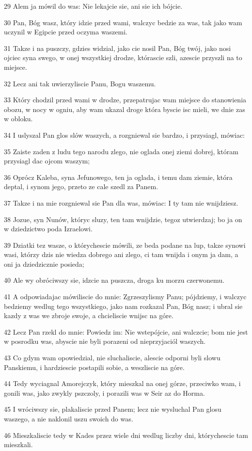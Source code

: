\par 29 Alem ja mówil do was: Nie lekajcie sie, ani sie ich bójcie.
\par 30 Pan, Bóg wasz, który idzie przed wami, walczyc bedzie za was, tak jako wam uczynil w Egipcie przed oczyma waszemi.
\par 31 Takze i na puszczy, gdzies widzial, jako cie nosil Pan, Bóg twój, jako nosi ojciec syna swego, w onej wszystkiej drodze, którascie szli, azescie przyszli na to miejsce.
\par 32 Lecz ani tak uwierzyliscie Panu, Bogu waszemu.
\par 33 Który chodzil przed wami w drodze, przepatrujac wam miejsce do stanowienia obozu, w nocy w ogniu, aby wam ukazal droge która byscie isc mieli, we dnie zas w obloku.
\par 34 I uslyszal Pan glos slów waszych, a rozgniewal sie bardzo, i przysiagl, mówiac:
\par 35 Zaiste zaden z ludu tego narodu zlego, nie oglada onej ziemi dobrej, któram przysiagl dac ojcom waszym;
\par 36 Oprócz Kaleba, syna Jefunowego, ten ja oglada, i temu dam ziemie, która deptal, i synom jego, przeto ze cale szedl za Panem.
\par 37 Takze i na mie rozgniewal sie Pan dla was, mówiac: I ty tam nie wnijdziesz.
\par 38 Jozue, syn Nunów, któryc sluzy, ten tam wnijdzie, tegoz utwierdzaj; bo ja on w dziedzictwo poda Izraelowi.
\par 39 Dziatki tez wasze, o którychescie mówili, ze beda podane na lup, takze synowi wasi, którzy dzis nie wiedza dobrego ani zlego, ci tam wnijda i onym ja dam, a oni ja dziedzicznie posieda;
\par 40 Ale wy obróciwszy sie, idzcie na puszcza, droga ku morzu czerwonemu.
\par 41 A odpowiadajac mówiliscie do mnie: Zgrzeszylismy Panu; pójdziemy, i walczyc bedziemy wedlug tego wszystkiego, jako nam rozkazal Pan, Bóg nasz; i ubral sie kazdy z was we zbroje swoje, a chcieliscie wnijsc na góre.
\par 42 Lecz Pan rzekl do mnie: Powiedz im: Nie wstepójcie, ani walczcie; bom nie jest w posrodku was, abyscie nie byli porazeni od nieprzyjaciól waszych.
\par 43 Co gdym wam opowiedzial, nie sluchaliscie, alescie odporni byli slowu Panskiemu, i hardziescie postapili sobie, a weszliscie na góre.
\par 44 Tedy wyciagnal Amorejczyk, który mieszkal na onej górze, przeciwko wam, i gonili was, jako zwykly pszczoly, i porazili was w Seir az do Horma.
\par 45 I wróciwszy sie, plakaliscie przed Panem; lecz nie wysluchal Pan glosu waszego, a nie naklonil uszu swoich do was.
\par 46 Mieszkaliscie tedy w Kades przez wiele dni wedlug liczby dni, którychescie tam mieszkali.

